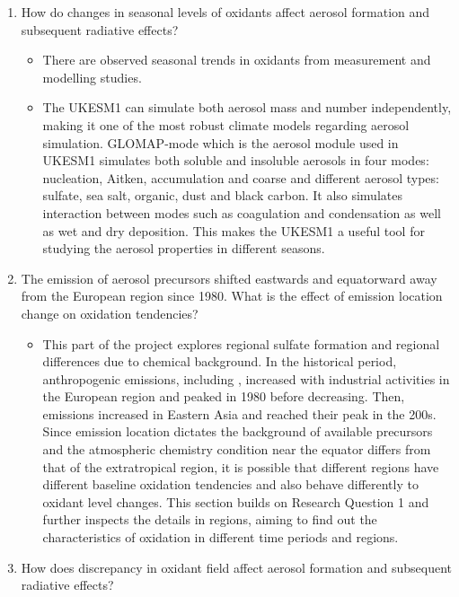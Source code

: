 \begin{enumerate}
    \item How do changes in seasonal levels of oxidants affect aerosol formation and subsequent radiative effects?

    \begin{itemize}
        \item There are observed seasonal trends in oxidants from measurement and modelling studies.
        \item The UKESM1 can simulate both aerosol mass and number independently, making it one of the most robust climate models regarding aerosol simulation. GLOMAP-mode which is the aerosol module used in UKESM1 simulates both soluble and insoluble aerosols in four modes: nucleation, Aitken, accumulation and coarse and different aerosol types: sulfate, sea salt, organic, dust and black carbon. It also simulates interaction between modes such as coagulation and condensation as well as wet and dry deposition. This makes the UKESM1 a useful tool for studying the aerosol properties in different seasons.
    \end{itemize}

    \item The emission of aerosol precursors shifted eastwards and equatorward away from the European region since 1980. What is the effect of emission location change on oxidation tendencies?

    \begin{itemize}
        \item This part of the project explores regional sulfate formation and regional differences due to chemical background. In the historical period, anthropogenic emissions, including , increased with industrial activities in the European region and peaked in 1980 before decreasing. Then, emissions increased in Eastern Asia and reached their peak in the 200s. Since  emission location dictates the background of available precursors and the atmospheric chemistry condition near the equator differs from that of the extratropical region, it is possible that different regions have different baseline oxidation tendencies and also behave differently to oxidant level changes. This section builds on Research Question 1 and further inspects the details in regions, aiming to find out the characteristics of oxidation in different time periods and regions.  
    \end{itemize}

    \item How does discrepancy in oxidant field affect aerosol formation and subsequent radiative effects?


\end{enumerate}
